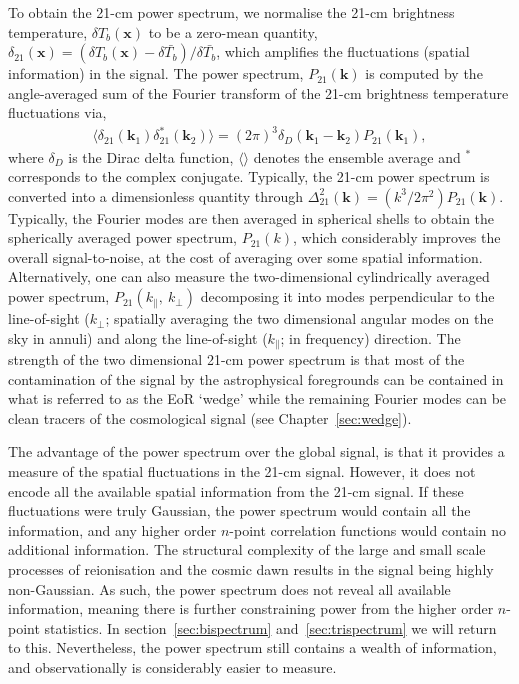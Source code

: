To obtain the 21-cm power spectrum, we normalise the 21-cm brightness temperature, $\delta T_{b}(\mathbf{x})$ to be a zero-mean quantity, $\delta_{21}(\mathbf{x}) = (\delta T_{b}(\mathbf{x}) - \delta\bar{T_{b}})/\delta\bar{T_{b}}$, which amplifies the fluctuations (spatial information) in the signal. The power spectrum, $P_{21}(\mathbf{k})$ is computed by the angle-averaged sum of the Fourier transform of the 21-cm brightness temperature fluctuations via,
\begin{eqnarray}
\langle \delta_{21}(\mathbf{k}_{1})\delta^{\ast}_{21}(\mathbf{k}_{2}) \rangle = (2\pi)^{3}\delta_{D}( \mathbf{k}_{1} - \mathbf{k}_{2})P_{21}(\mathbf{k}_{1}),
\end{eqnarray}
where $\delta_{D}$ is the Dirac delta function, $\langle \rangle$ denotes the ensemble average and $^\ast$ corresponds to the complex conjugate. Typically, the 21-cm power spectrum is converted into a dimensionless quantity through $\Delta^{2}_{21}(\mathbf{k}) = (k^{3}/2\pi^{2})P_{21}(\mathbf{k})$. Typically, the Fourier modes are then averaged in spherical shells to obtain the spherically averaged power spectrum, $P_{21}(k)$, which considerably improves the overall signal-to-noise, at the cost of averaging over some spatial information. Alternatively, one can also measure the two-dimensional cylindrically averaged power spectrum, $P_{21}(k_\parallel,~k_\perp)$ decomposing it into modes perpendicular to the line-of-sight ($k_\perp$; spatially averaging the two dimensional angular modes on the sky in annuli) and along the line-of-sight ($k_\parallel$; in frequency) direction. The strength of the two dimensional 21-cm power spectrum is that most of the contamination of the signal by the astrophysical foregrounds can be contained in what is referred to as the EoR `wedge' while the remaining Fourier modes can be clean tracers of the cosmological signal (see Chapter~\ref{sec:wedge}).

The advantage of the power spectrum over the global signal, is that it provides a measure of the spatial fluctuations in the 21-cm signal. However, it does not encode all the available spatial information from the 21-cm signal. If these fluctuations were truly Gaussian, the power spectrum would contain all the information, and any higher order $n$-point correlation functions would contain no additional information. The structural complexity of the large and small scale processes of reionisation and the cosmic dawn results in the signal being highly non-Gaussian. As such, the power spectrum does not reveal all available information, meaning there is further constraining power from the higher order $n$-point statistics. In section~\ref{sec:bispectrum} and~\ref{sec:trispectrum}  we will return to this. Nevertheless, the power spectrum still contains a wealth of information, and observationally is considerably easier to measure.


